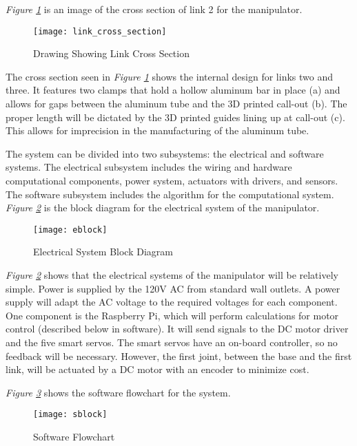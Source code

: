 \emph{Figure \ref{fig:link2}} is an image of the cross section of link 2 for the manipulator.
\begin{figure}[htp]
  \centering
  \texttt{[image: link\_cross\_section]}
  \caption{Drawing Showing Link Cross Section}
  \label{fig:link2}
\end{figure}

The cross section seen in \emph{Figure \ref{fig:link2}} shows the internal design for links two and three. It features two clamps that hold a hollow aluminum bar in place (a) and allows for gaps between the aluminum tube and the 3D printed call-out (b). The proper length will be dictated by the 3D printed guides lining up at call-out (c). This allows for imprecision in the manufacturing of the aluminum tube.

The system can be divided into two subsystems: the electrical and software systems. The electrical subsystem includes the wiring and hardware computational components, power system, actuators with drivers, and sensors. The software subsystem includes the algorithm for the computational system.
\emph{Figure \ref{fig:eblock}} is the block diagram for the electrical system of the manipulator.

\begin{figure}[htp]
  \centering
  \texttt{[image: eblock]}
  \caption{Electrical System Block Diagram}
  \label{fig:eblock}
\end{figure}

\emph{Figure \ref{fig:eblock}} shows that the electrical systems of the manipulator will be relatively simple. Power is supplied by the 120V AC from standard wall outlets. A power supply will adapt the AC voltage to the required voltages for each component. One component is the Raspberry Pi, which will perform calculations for motor control (described below in software). It will send signals to the DC motor driver and the five smart servos. The smart servos have an on-board controller, so no feedback will be necessary. However, the first joint, between the base and the first link, will be actuated by a DC motor with an encoder to minimize cost.

\emph{Figure \ref{fig:sblock}} shows the software flowchart for the system.
\begin{figure}[ht]
  \centering
  \texttt{[image: sblock]}
  \caption{Software Flowchart}
  \label{fig:sblock}
\end{figure}

